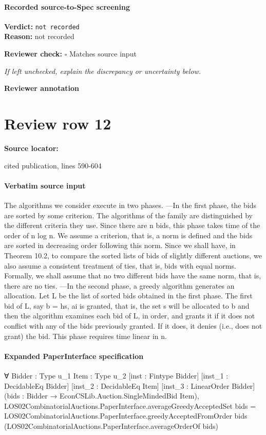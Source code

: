 \documentclass[10pt]{article}
\newcommand{\reviewerbox}{%
  \par\noindent\fbox{\parbox{0.96\linewidth}{\rule{0pt}{0.38in}}}\par
}
\newcommand{\reviewmatch}[1]{%
  \par\noindent\textbf{Reviewer check:} $\square$\; #1\par
  \noindent\emph{If left unchecked, explain the discrepancy or uncertainty below.}\par
}
\begin{document}
\paragraph{Recorded source-to-Spec screening}
\textbf{Verdict:} \texttt{not recorded}
\\
\textbf{Reason:} not recorded
\reviewmatch{Matches source input}
\noindent\textbf{Reviewer annotation}\par
\reviewerbox
\clearpage
\hypertarget{source-claim-7aabe039cb95f484}{}
\section*{Review row 12}
\textbf{Source locator:} {\footnotesize\raggedright cited publication, lines 590-\allowbreak{}604\par}
\paragraph{Verbatim source input}
\begin{ReviewVerbatim}
The algorithms we consider execute in two phases.
—In the first phase, the bids are sorted by some criterion. The algorithms of the
family are distinguished by the different criteria they use. Since there are n bids,
this phase takes time of the order of n log n. We assume a criterion, that is, a norm
is defined and the bids are sorted in decreasing order following this norm. Since
we shall have, in Theorem 10.2, to compare the sorted lists of bids of slightly
different auctions, we also assume a consistent treatment of ties, that is, bids
with equal norms. Formally, we shall assume that no two different bids have the
same norm, that is, there are no ties.
—In the second phase, a greedy algorithm generates an allocation. Let L be the
list of sorted bids obtained in the first phase. The first bid of L, say b = hs, ai is
granted, that is, the set s will be allocated to b and then the algorithm examines
each bid of L, in order, and grants it if it does not conflict with any of the bids
previously granted. If it does, it denies (i.e., does not grant) the bid. This phase
requires time linear in n.
\end{ReviewVerbatim}


\paragraph{Expanded PaperInterface specification}
\begin{ReviewVerbatim}
∀ {Bidder : Type u_1} {Item : Type u_2} [inst : Fintype Bidder] [inst_1 : DecidableEq Bidder]
  [inst_2 : DecidableEq Item] [inst_3 : LinearOrder Bidder] (bids : Bidder → EconCSLib.Auction.SingleMindedBid Item),
  LOS02CombinatorialAuctions.PaperInterface.averageGreedyAcceptedSet bids =
    LOS02CombinatorialAuctions.PaperInterface.greedyAcceptedFromOrder bids
      (LOS02CombinatorialAuctions.PaperInterface.averageOrderOf bids)
\end{ReviewVerbatim}
\end{document}
